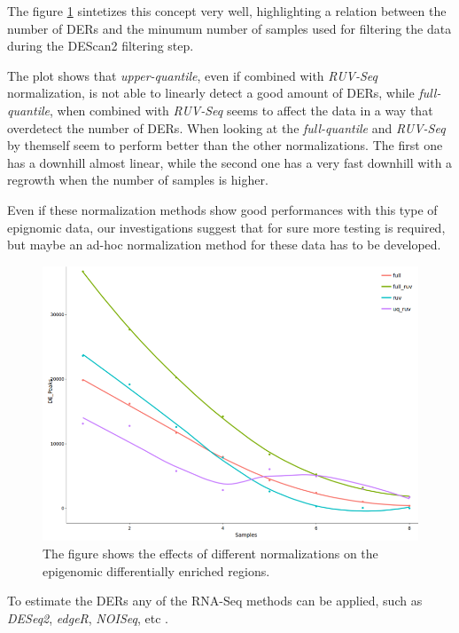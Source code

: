 The figure \ref{fig:normalizationsdescan} sintetizes this concept very well, highlighting a relation between the number of DERs and the minumum number of samples used for filtering the data during the DEScan2 filtering step.

The plot shows that \textit{upper-quantile}, even if combined with \textit{RUV-Seq} normalization, is not able to linearly detect a good amount of DERs, while \textit{full-quantile}, when combined with \textit{RUV-Seq} seems to affect the data in a way that overdetect the number of DERs. 
When looking at the \textit{full-quantile} and \textit{RUV-Seq} by themself seem to perform better than the other normalizations. The first one has a downhill almost linear, while the second one has a very fast downhill with a regrowth when the number of samples is higher.

Even if these normalization methods show good performances with this type of epignomic data, our investigations suggest that for sure more testing is required, but maybe an ad-hoc normalization method for these data has to be developed.

\begin{figure}[H]
\centering
\includegraphics[width=\textwidth, height=\textheight, keepaspectratio]{img/descan2/normalizations.png}
\caption[Normalizations applied to detected regions]{The figure shows the effects of different normalizations on the epigenomic differentially enriched regions.}
\label{fig:normalizationsdescan}
\centering
\end{figure}

To estimate the DERs any of the RNA-Seq methods can be applied, such as \textit{DESeq2}, \textit{edgeR}, \textit{NOISeq}, etc \cite{Robinson2009, McCarthy2012, Tarazona2012}.

